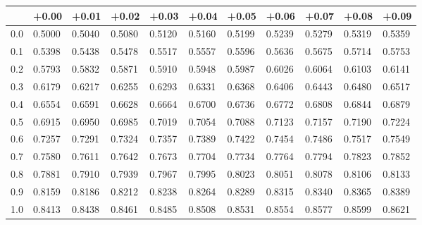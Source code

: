 \begin{tabular}{lllllllllll}
\toprule
 & +0.00 & +0.01 & +0.02 & +0.03 & +0.04 & +0.05 & +0.06 & +0.07 & +0.08 & +0.09 \\
\midrule
0.0 & \cellcolor{gray!20}0.5000 & \cellcolor{gray!20}0.5040 & \cellcolor{gray!20}0.5080 & \cellcolor{gray!20}0.5120 & \cellcolor{gray!20}0.5160 & \cellcolor{gray!20}0.5199 & \cellcolor{gray!20}0.5239 & \cellcolor{gray!20}0.5279 & \cellcolor{gray!20}0.5319 & \cellcolor{gray!20}0.5359 \\
0.1 & 0.5398 & 0.5438 & 0.5478 & 0.5517 & 0.5557 & 0.5596 & 0.5636 & 0.5675 & 0.5714 & 0.5753 \\
0.2 & \cellcolor{gray!20}0.5793 & \cellcolor{gray!20}0.5832 & \cellcolor{gray!20}0.5871 & \cellcolor{gray!20}0.5910 & \cellcolor{gray!20}0.5948 & \cellcolor{gray!20}0.5987 & \cellcolor{gray!20}0.6026 & \cellcolor{gray!20}0.6064 & \cellcolor{gray!20}0.6103 & \cellcolor{gray!20}0.6141 \\
0.3 & 0.6179 & 0.6217 & 0.6255 & 0.6293 & 0.6331 & 0.6368 & 0.6406 & 0.6443 & 0.6480 & 0.6517 \\
0.4 & \cellcolor{gray!20}0.6554 & \cellcolor{gray!20}0.6591 & \cellcolor{gray!20}0.6628 & \cellcolor{gray!20}0.6664 & \cellcolor{gray!20}0.6700 & \cellcolor{gray!20}0.6736 & \cellcolor{gray!20}0.6772 & \cellcolor{gray!20}0.6808 & \cellcolor{gray!20}0.6844 & \cellcolor{gray!20}0.6879 \\
0.5 & 0.6915 & 0.6950 & 0.6985 & 0.7019 & 0.7054 & 0.7088 & 0.7123 & 0.7157 & 0.7190 & 0.7224 \\
0.6 & \cellcolor{gray!20}0.7257 & \cellcolor{gray!20}0.7291 & \cellcolor{gray!20}0.7324 & \cellcolor{gray!20}0.7357 & \cellcolor{gray!20}0.7389 & \cellcolor{gray!20}0.7422 & \cellcolor{gray!20}0.7454 & \cellcolor{gray!20}0.7486 & \cellcolor{gray!20}0.7517 & \cellcolor{gray!20}0.7549 \\
0.7 & 0.7580 & 0.7611 & 0.7642 & 0.7673 & 0.7704 & 0.7734 & 0.7764 & 0.7794 & 0.7823 & 0.7852 \\
0.8 & \cellcolor{gray!20}0.7881 & \cellcolor{gray!20}0.7910 & \cellcolor{gray!20}0.7939 & \cellcolor{gray!20}0.7967 & \cellcolor{gray!20}0.7995 & \cellcolor{gray!20}0.8023 & \cellcolor{gray!20}0.8051 & \cellcolor{gray!20}0.8078 & \cellcolor{gray!20}0.8106 & \cellcolor{gray!20}0.8133 \\
0.9 & 0.8159 & 0.8186 & 0.8212 & 0.8238 & 0.8264 & 0.8289 & 0.8315 & 0.8340 & 0.8365 & 0.8389 \\
1.0 & \cellcolor{gray!20}0.8413 & \cellcolor{gray!20}0.8438 & \cellcolor{gray!20}0.8461 & \cellcolor{gray!20}0.8485 & \cellcolor{gray!20}0.8508 & \cellcolor{gray!20}0.8531 & \cellcolor{gray!20}0.8554 & \cellcolor{gray!20}0.8577 & \cellcolor{gray!20}0.8599 & \cellcolor{gray!20}0.8621 \\

\end{tabular}
